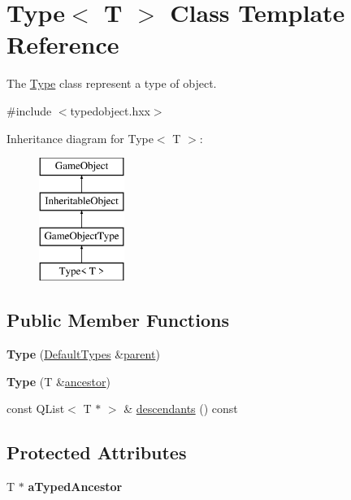 \hypertarget{class_type}{\section{\-Type$<$ \-T $>$ \-Class \-Template \-Reference}
\label{class_type}
}


\-The \hyperlink{class_type}{\-Type} class represent a type of object.  




{\ttfamily \#include $<$typedobject.\-hxx$>$}

\-Inheritance diagram for \-Type$<$ \-T $>$\-:\begin{figure}[H]
\begin{center}
\leavevmode
\includegraphics[height=4.000000cm]{class_type}
\end{center}
\end{figure}
\subsection*{\-Public \-Member \-Functions}
\begin{DoxyCompactItemize}
\item 
\hypertarget{class_type_aea9c6be9b52e1e356ffb0123f2815c21}{{\bfseries \-Type} (\hyperlink{class_default_types}{\-Default\-Types} \&\hyperlink{class_game_object_af3deaf39cde23c189765634e32e95bb4}{parent})}\label{class_type_aea9c6be9b52e1e356ffb0123f2815c21}

\item 
\hypertarget{class_type_a8d71537af478aaedd7aaab6b50e5bfb9}{{\bfseries \-Type} (\-T \&\hyperlink{class_inheritable_object_a10eead70368227b7f15f44f91d234fa5}{ancestor})}\label{class_type_a8d71537af478aaedd7aaab6b50e5bfb9}

\item 
const \-Q\-List$<$ \-T $\ast$ $>$ \& \hyperlink{class_type_a9a0a8abd01f78839622bb5b017b05053}{descendants} () const 
\end{DoxyCompactItemize}
\subsection*{\-Protected \-Attributes}
\begin{DoxyCompactItemize}
\item 
\hypertarget{class_type_a31500ab33536c9bc8be28ad1385a3493}{\-T $\ast$ {\bfseries a\-Typed\-Ancestor}}\label{class_type_a31500ab33536c9bc8be28ad1385a3493}

\end{DoxyCompactItemize}


